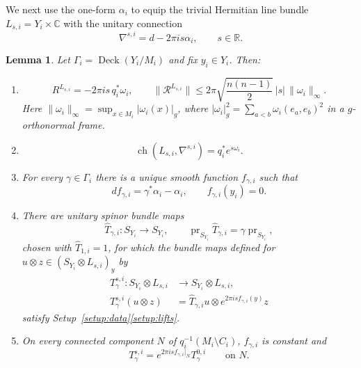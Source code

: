 \documentclass[12pt,reqno]{amsart}
\numberwithin{equation}{section}
\newtheorem{lemma}[theorem]{Lemma}
\theoremstyle{definition}
\newcommand{\ch}{\operatorname{ch}}
\newcommand{\Deck}{\operatorname{Deck}}
\newcommand{\cR}{\mathcal R}
\begin{document}
We next use the one-form $\alpha_i$ to equip the trivial Hermitian line bundle
$L_{s,i}=Y_i\times\mathbb C$ with the unitary connection
\[
 \nabla^{s,i}=d-2\pi is\alpha_i,
 \qquad s\in\mathbb R.
\]



\begin{lemma}\label{lem:H-twists}
Let $\Gamma_i=\Deck(Y_i/M_i)$ and fix $y_i\in Y_i$.  Then:
\begin{enumerate}[label=\textup{(H\arabic*)},ref=\textup{(H\arabic*)},
                  start=7,leftmargin=3.4em]
\item\label{H:curvature}
\[
 R^{L_{s,i}}=-2\pi is\,q_i^*\omega_i,
 \qquad
 \|\cR^{L_{s,i}}\|
 \leq 2\pi\sqrt{\frac{n(n-1)}2}\,
       |s|\,\|\omega_i\|_\infty.
\]
Here $\|\omega_i\|_\infty=\sup_{x\in M_i}|\omega_i(x)|_g$,
where $|\omega_i|_g^2=\sum_{a<b}\omega_i(e_a,e_b)^2$ in a
$g$-orthonormal frame.

\item\label{H:chern}
\[
 \ch(L_{s,i},\nabla^{s,i})=q_i^*e^{s\omega_i}.
\]

\item\label{H:potentials}
For every $\gamma\in\Gamma_i$ there is a unique smooth function
$f_{\gamma,i}$ such that
\begin{equation}\label{eq:H-f}
 df_{\gamma,i}=\gamma^*\alpha_i-\alpha_i,
 \qquad f_{\gamma,i}(y_i)=0.
\end{equation}

\item\label{H:maps}
There are unitary spinor bundle maps
\[
 \widehat T_{\gamma,i}:S_{Y_i}\longrightarrow S_{Y_i},
 \qquad
 \operatorname{pr}_{S_{Y_i}}\widehat T_{\gamma,i}
 =\gamma\operatorname{pr}_{S_{Y_i}},
\]
chosen with $\widehat T_{1,i}=1$, for which the bundle maps defined
for $u\otimes z\in(S_{Y_i}\otimes L_{s,i})_y$ by
\[
\begin{aligned}
 T^{s,i}_\gamma:S_{Y_i}\otimes L_{s,i}
 &\longrightarrow S_{Y_i}\otimes L_{s,i},\\
 T^{s,i}_\gamma(u\otimes z)
 &=\widehat T_{\gamma,i}u\otimes
   e^{2\pi isf_{\gamma,i}(y)}z
\end{aligned}
\]
satisfy Setup~\ref{setup:data}\ref{setup:lifts}.

\item\label{H:phase}
On every connected component $N$ of
$q_i^{-1}(M_i\setminus C_i)$, $f_{\gamma,i}$ is constant and
\begin{equation}\label{eq:H-component-phase}
 T^{s,i}_\gamma
 =e^{2\pi isf_{\gamma,i}|_N}T^{0,i}_\gamma
 \qquad\text{on }N.
\end{equation}
\end{enumerate}
\end{lemma}
\end{document}
